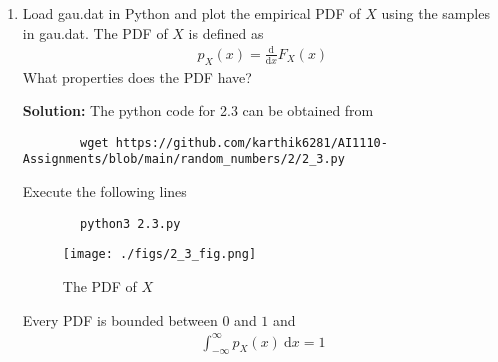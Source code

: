\documentclass[journal,12pt,twocolumn]{IEEEtran}
\newcommand{\solution}{\noindent \textbf{Solution: }}
\providecommand{\der}[1]{\mathrm{d} #1}
\numberwithin{equation}{section}
\renewcommand\thesection{\arabic{section}}
\begin{document}
\begin{enumerate}[label=\thesection.\arabic*,ref=\thesection.\theenumi]
\begin{enumerate}[label=\thesection.\arabic*,ref=\thesection.\theenumi]
	\solution The python code for 2.2 can be obtained from
	\begin{lstlisting}
		wget https://github.com/karthik6281/AI1110-Assignments/blob/main/random_numbers/2/2_2.py
	\end{lstlisting}
	Execute the following lines
	\begin{lstlisting}
		python3 2_2.py
	\end{lstlisting}
	\begin{figure}
		\centering
		\texttt{[image: ./figs/2\_2\_fig.png]}
		\caption{The CDF of $X$}
		\label{fig-2.2}
	\end{figure}
	
	\begin{itemize}
\item $\Phi(x)=P(Z \leq x)= \frac{1}{\sqrt{2 \pi}} \int_{-\infty}^{x}\exp\left\{-\frac{u^2}{2}\right\} du$
\item $\lim \limits_{x\rightarrow \infty} \Phi(x)=1, \hspace{5pt} \lim \limits_{x\rightarrow -\infty} \Phi(x)=0$
\item  $\Phi(0)=\frac{1}{2}$
\item  $\Phi(-x)=1-\Phi(x)$
\end{itemize}
	\item Load gau.dat in Python and plot the empirical PDF of $X$ using the samples in gau.dat. The PDF of $X$ is defined as
	\begin{align}
		p_{X}(x) = \frac{\der{}}{\der{x}}F_{X}(x)
	\end{align}
	What properties does the PDF have?
	
	\solution The python code for 2.3 can be obtained from
	\begin{lstlisting}
		wget https://github.com/karthik6281/AI1110-Assignments/blob/main/random_numbers/2/2_3.py
	\end{lstlisting}
	Execute the following lines
	\begin{lstlisting}
		python3 2.3.py
	\end{lstlisting}
	\begin{figure}
		\centering
		\texttt{[image: ./figs/2\_3\_fig.png]}
		\caption{The PDF of $X$}
		\label{fig-2.3}
	\end{figure}
	
	Every PDF is bounded between $0$ and $1$ and
	\begin{align}
		\int_{-\infty}^{\infty} p_{X}(x) ~\mathrm{d}x = 1
	\end{align}
	

\end{enumerate}
\end{enumerate}
\end{document}
